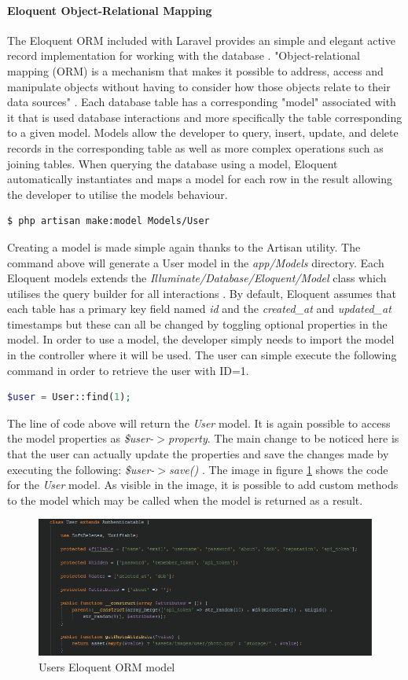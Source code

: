 \paragraph{Eloquent Object-Relational Mapping}
The Eloquent ORM included with Laravel provides an simple and elegant active record implementation for working with the database \cite{Laravel:Eloquent}. "Object-relational mapping (ORM) is a mechanism that makes it possible to address, access and manipulate objects without having to consider how those objects relate to their data sources" \cite{TechTarget:ORM}. Each database table has a corresponding "model" associated with it that is used database interactions and more specifically the table corresponding to a given model. Models allow the developer to query, insert, update, and delete records in the corresponding table as well as more complex operations such as joining tables. When querying the database using a model, Eloquent automatically instantiates and maps a model for each row in the result allowing the developer to utilise the models behaviour.

\begin{lstlisting}[language=bash]
	$ php artisan make:model Models/User
\end{lstlisting}

Creating a model is made simple again thanks to the Artisan utility. The command above will generate a User model in the \emph{app/Models} directory. Each Eloquent models extends the \emph{Illuminate/Database/Eloquent/Model} class which utilises the query builder for all interactions \cite{Laravel:Eloquent}. By default, Eloquent assumes that each table has a primary key field named \emph{id} and the \emph{created\_at} and \emph{updated\_at} timestamps but these can all be changed by toggling optional properties in the model. In order to use a model, the developer simply needs to import the model in the controller where it will be used. The user can simple execute the following command in order to retrieve the user with ID=1.

\begin{lstlisting}[language=php]
	$user = User::find(1);
\end{lstlisting}

The line of code above will return the \emph{User} model. It is again possible to access the model properties as \emph{\$user-$>$property}. The main change to be noticed here is that the user can actually update the properties and save the changes made by executing the following: \emph{\$user-$>$save()} \cite{Laravel:Eloquent}.  The image in figure \ref{fig:UserModel} shows the code for the \emph{User} model. As visible in the image, it is possible to add custom methods to the model which may be called when the model is returned as a result.

\begin{figure}[H]
	\centering
	\includegraphics[width=1.0\textwidth]{Images/Implementation/UserModel}
	\caption{Users Eloquent ORM model} \label{fig:UserModel}
\end{figure}